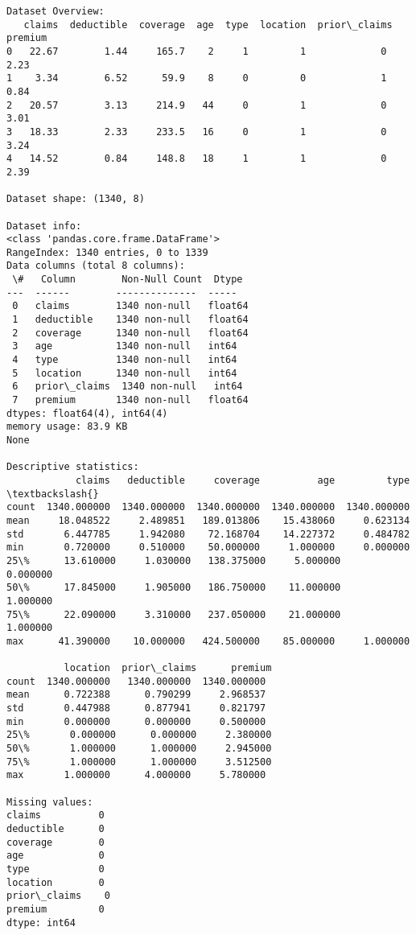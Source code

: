\documentclass[8pt, twocolumn]{extarticle}
\begin{document}
    \begin{Verbatim}[commandchars=\\\{\}]
Dataset Overview:
   claims  deductible  coverage  age  type  location  prior\_claims  premium
0   22.67        1.44     165.7    2     1         1             0     2.23
1    3.34        6.52      59.9    8     0         0             1     0.84
2   20.57        3.13     214.9   44     0         1             0     3.01
3   18.33        2.33     233.5   16     0         1             0     3.24
4   14.52        0.84     148.8   18     1         1             0     2.39

Dataset shape: (1340, 8)

Dataset info:
<class 'pandas.core.frame.DataFrame'>
RangeIndex: 1340 entries, 0 to 1339
Data columns (total 8 columns):
 \#   Column        Non-Null Count  Dtype
---  ------        --------------  -----
 0   claims        1340 non-null   float64
 1   deductible    1340 non-null   float64
 2   coverage      1340 non-null   float64
 3   age           1340 non-null   int64
 4   type          1340 non-null   int64
 5   location      1340 non-null   int64
 6   prior\_claims  1340 non-null   int64
 7   premium       1340 non-null   float64
dtypes: float64(4), int64(4)
memory usage: 83.9 KB
None

Descriptive statistics:
            claims   deductible     coverage          age         type  \textbackslash{}
count  1340.000000  1340.000000  1340.000000  1340.000000  1340.000000
mean     18.048522     2.489851   189.013806    15.438060     0.623134
std       6.447785     1.942080    72.168704    14.227372     0.484782
min       0.720000     0.510000    50.000000     1.000000     0.000000
25\%      13.610000     1.030000   138.375000     5.000000     0.000000
50\%      17.845000     1.905000   186.750000    11.000000     1.000000
75\%      22.090000     3.310000   237.050000    21.000000     1.000000
max      41.390000    10.000000   424.500000    85.000000     1.000000

          location  prior\_claims      premium
count  1340.000000   1340.000000  1340.000000
mean      0.722388      0.790299     2.968537
std       0.447988      0.877941     0.821797
min       0.000000      0.000000     0.500000
25\%       0.000000      0.000000     2.380000
50\%       1.000000      1.000000     2.945000
75\%       1.000000      1.000000     3.512500
max       1.000000      4.000000     5.780000

Missing values:
claims          0
deductible      0
coverage        0
age             0
type            0
location        0
prior\_claims    0
premium         0
dtype: int64


\end{Verbatim}
\end{document}
